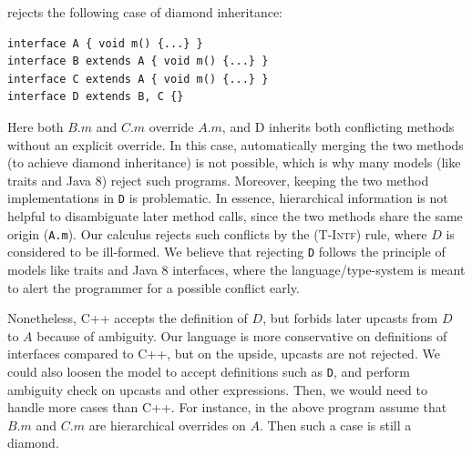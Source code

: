 \MIM{} rejects the following case of diamond inheritance:
\begin{lstlisting}
interface A { void m() {...} }
interface B extends A { void m() {...} }
interface C extends A { void m() {...} }
interface D extends B, C {}
\end{lstlisting}
Here both $B.m$ and $C.m$ override $A.m$, and D inherits
both conflicting methods without an explicit override. In this case, automatically merging 
the two methods (to achieve diamond inheritance) is not possible, which is why many 
models (like traits and Java 8) reject such programs. Moreover, keeping the two 
method implementations in \lstinline|D| is problematic. 
In essence, hierarchical information is 
not helpful to disambiguate later method calls, since the two methods share 
the same origin (\lstinline|A.m|). 
Our calculus rejects such conflicts by the \textsc{(T-Intf)} rule, where $D$ is considered to be ill-formed. 
We believe that rejecting \lstinline|D| follows the principle of models like traits and Java 8 interfaces, 
where the language/type-system is meant to alert the programmer for a possible conflict early.

Nonetheless,
 C++ accepts the definition of $D$, but forbids later upcasts from $D$ to $A$ because of ambiguity. Our language is more conservative on definitions of interfaces compared to C++, but on the upside, upcasts are not rejected. We could also loosen the model to accept definitions such as \lstinline|D|, and perform ambiguity check on upcasts and other expressions. Then, we would need to handle more cases than C++. For instance, in the above program assume that $B.m$ and $C.m$ are hierarchical overrides on $A$. Then such a case is still a diamond.

